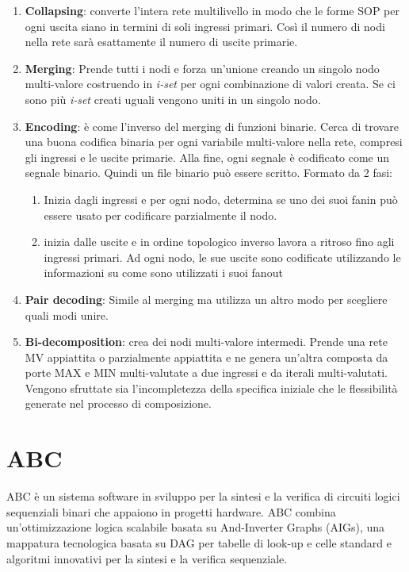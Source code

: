 \documentclass[
  italian,
]{book}
\providecommand{\tightlist}{%
  \setlength{\itemsep}{0pt}\setlength{\parskip}{0pt}}
\begin{document}
\begin{enumerate}
\def\labelenumi{\arabic{enumi}.}
\tightlist
\item
  \textbf{Collapsing}: converte l'intera rete multilivello in modo che le forme SOP per ogni uscita siano in termini di soli ingressi primari. Così il numero di nodi nella rete sarà esattamente il numero di uscite primarie.
\item
  \textbf{Merging}: Prende tutti i nodi e forza un'unione creando un singolo nodo multi-valore costruendo in \emph{i-set} per ogni combinazione di valori creata. Se ci sono più \emph{i-set} creati uguali vengono uniti in un singolo nodo.
\item
  \textbf{Encoding}: è come l'inverso del merging di funzioni binarie. Cerca di trovare una buona codifica binaria per ogni variabile multi-valore nella rete, compresi gli ingressi e le uscite primarie. Alla fine, ogni segnale è codificato come un segnale binario. Quindi un file binario può essere scritto. Formato da 2 fasi:

  \begin{enumerate}
  \def\labelenumii{\arabic{enumii}.}
  \tightlist
  \item
    Inizia dagli ingressi e per ogni nodo, determina se uno dei suoi fanin può essere usato per codificare parzialmente il nodo.
  \item
    inizia dalle uscite e in ordine topologico inverso lavora a ritroso fino agli ingressi primari. Ad ogni nodo, le sue uscite sono codificate utilizzando le informazioni su come sono utilizzati i suoi fanout
  \end{enumerate}
\item
  \textbf{Pair decoding}: Simile al merging ma utilizza un altro modo per scegliere quali modi unire.
\item
  \textbf{Bi-decomposition}: crea dei nodi multi-valore intermedi. Prende una rete MV appiattita o parzialmente appiattita e ne genera un'altra composta da porte MAX e MIN multi-valutate a due ingressi e da iterali multi-valutati. Vengono sfruttate sia l'incompletezza della specifica iniziale che le flessibilità generate nel processo di composizione.
\end{enumerate}

\hypertarget{abc}{%
\section{ABC}\label{abc}}

ABC è un sistema software in sviluppo per la sintesi e la verifica di circuiti logici sequenziali binari che appaiono in progetti hardware. ABC combina un'ottimizzazione logica scalabile basata su And-Inverter Graphs (AIGs), una mappatura tecnologica basata su DAG per tabelle di look-up e celle standard e algoritmi innovativi per la sintesi e la verifica sequenziale.
\end{document}
